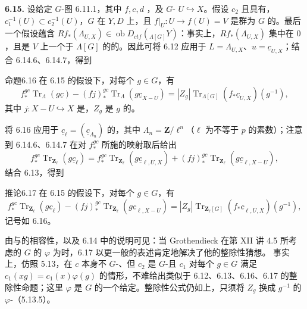 \textbf{6.15.} 设给定 $G$-图 6.11.1，其中 $f,c,d$ ，及 $G$- $U\hookrightarrow X$。假设 $c_2$ 且具有，$c_1^{-1}(U)\subset c_2^{-1}(U)$，$G$ 在 $Y,D$ 上，且 $f|_U:U\to f(U)=V$ 是群为 $G$ 的。最后一个假设蕴含 $Rf_*(\Lambda_{U,X})\in\operatorname{ob}D_{ctf}({}_{\Lambda[G]}Y)$：事实上，$Rf_*(\Lambda_{U,X})$ 集中在 $0$，且是 $V$ 上一个于 $\Lambda[G]$ 的的。因此可将 6.12 应用于 $L=\Lambda_{U,X}$、$u=\underline c_{U,X}$；结合 6.14.6、6.14.7，得到
\begin{SGAresult}{命题}{6.16}
在 6.15 的假设下，对每个 $g\in G$，有
\begin{equation}f_*^{gc}\operatorname{Tr}_\Lambda(g\underline c)-(fj)_*^{gc}\operatorname{Tr}_\Lambda(g\underline c_{X-U})=|Z_g|\operatorname{Tr}_{\Lambda[G]}(f_*\underline c_{U,X})(g^{-1}),\tag{6.16.1}\end{equation}
其中 $j:X-U\hookrightarrow X$ 是，$Z_g$ 是 $g$ 的。
\end{SGAresult}
将 6.16 应用于 $\underline c_\ell=(\underline c_{\Lambda_n})$ 的，其中 $\Lambda_n=\mathbf Z/\ell^n$（$\ell$ 为不等于 $p$ 的素数）；注意到 6.14.6、6.14.7 在对 $f_*^{gc}$ 所施的映射取后给出
\[f_*^{gc}\operatorname{Tr}_{\mathbf Z_\ell}(g\underline c_\ell)=f_*^{gc}\operatorname{Tr}_{\mathbf Z_\ell}(g\underline c_{\ell,U,X})+(fj)_*^{gc}\operatorname{Tr}_{\mathbf Z_\ell}(g\underline c_{\ell,X-U}),\]
结合 6.13，得到
\begin{SGAresult}{推论}{6.17}
在 6.15 的假设下，对每个 $g\in G$，有
\begin{equation}f_*^{gc}\operatorname{Tr}_{\mathbf Z_\ell}(g\underline c_\ell)-(fj)_*^{gc}\operatorname{Tr}_{\mathbf Z_\ell}(g\underline c_{\ell,X-U})=|Z_g|\operatorname{Tr}_{\mathbf Z_\ell[G]}(f_*\underline c_{\ell,U,X})(g^{-1}),\tag{6.17.1}\end{equation}
记号如 6.16。
\end{SGAresult}
由与的相容性，以及 6.14 中的说明可见：当 Grothendieck 在第 XII 讲 4.5 所考虑的 $G$ 的 $\varphi$ 为时，6.17 以更一般的表述肯定地解决了他的整除性猜想。
事实上，仿照 5.13，在 $c$ 本身不 $G$-、但 $c_2$ 是 $G$-且 $c_1$ 对每个 $g\in G$ 满足 $c_1(xg)=c_1(x)\varphi(g)$ 的情形，不难给出类似于 6.12、6.13、6.16、6.17 的整除性命题；这里 $\varphi$ 是 $G$ 的一个给定。整除性公式仍如上，只须将 $Z_g$ 换成 $g^{-1}$ 的 $\varphi$-（5.13.5）。

